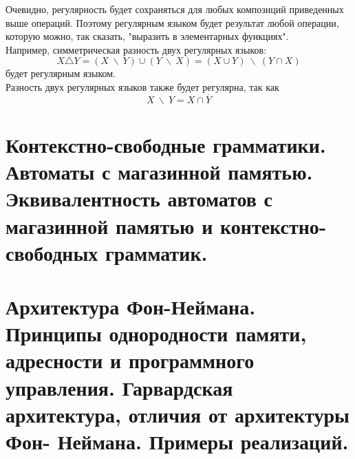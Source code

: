 \begin{multicols}{2}
\begin{center}
\end{center}

Очевидно, регулярность будет сохраняться для любых композиций приведенных выше операций. Поэтому регулярным языком будет результат любой операции, которую можно, так сказать, "выразить в элементарных функциях". \\
Например, симметрическая разность двух регулярных языков:
\[X \triangle Y = (X \ \backslash \ Y) \cup (Y \ \backslash \ X) = (X \cup Y) \ \backslash \ (Y \cap X)\]
будет регулярным языком. \\
Разность двух регулярных языков также будет регулярна, так как
\[X \ \backslash \ Y = X \cap \overline{Y}\]

    \section{Контекстно-свободные грамматики. Автоматы с магазинной памятью. Эквивалентность
    автоматов с магазинной памятью и контекстно-свободных грамматик.}

    \section{Архитектура Фон-Неймана. Принципы однородности памяти, адресности и
    программного управления. Гарвардская архитектура, отличия от архитектуры Фон-
    Неймана. Примеры реализаций.}


\end{multicols}

